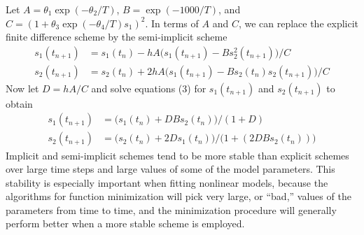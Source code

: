 \documentclass{admbmanual}
\begin{document}
Let $A=\theta_1\exp(-\theta_2/T)$, $B=\exp(-1000/T)$, and
$C=(1+\theta_3\exp(-\theta_4/T)s_1)^2$. In terms of $A$ and $C$, we can replace
the explicit finite difference scheme by the semi-implicit scheme
\begin{align}
  \nonumber
  s_1(t_{n+1}) &= s_1(t_n)-hA\big(s_1(t_{n+1})-B  s_2^2(t_{n+1})\big)/C \\[6pt]
  s_2(t_{n+1}) &= s_2(t_n)+2hA\big(s_1(t_{n+1})-Bs_2(t_n) s_2(t_{n+1})\big)/C
\end{align}
Now let $D=hA/C$ and solve equations (3) for
$s_1(t_{n+1})$ and $s_2(t_{n+1})$ to obtain
\begin{align}
  \nonumber
  s_1(t_{n+1})&= \big(s_1(t_n)+DB s_2(t_n)\big)/(1+D) \\[6pt]
  s_2(t_{n+1})&= \big(s_2(t_n)+2Ds_1(t_n)\big)/  \big(1+(2DBs_2(t_n))\big)
\end{align}
Implicit and semi-implicit schemes tend to be more stable than explicit schemes
over large time steps and large values of some of the model parameters. This
stability is especially important when fitting nonlinear models, because the
algorithms for function minimization will pick very large, or ``bad,'' values of
the parameters from time to time, and the minimization procedure will generally
perform better when a more stable scheme is employed.
\end{document}
